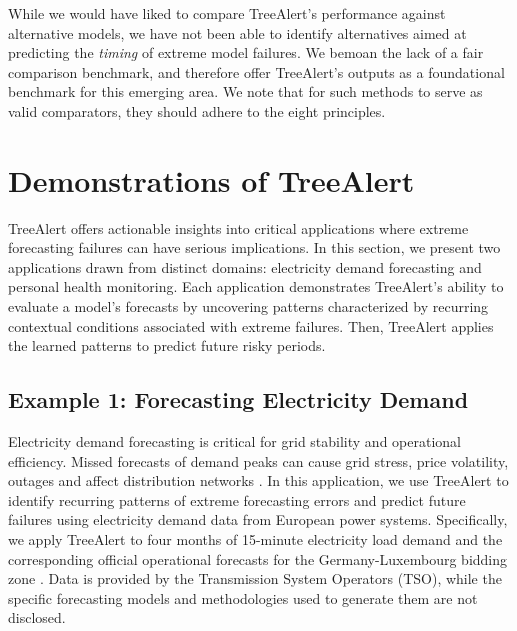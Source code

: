 \documentclass[12pt]{article}
\begin{document}
While we would have liked to compare TreeAlert's performance against alternative models, we have not been able to identify alternatives aimed at predicting the \emph{timing} of extreme model failures. We bemoan the lack of a fair comparison benchmark, %
and therefore offer TreeAlert's outputs as a foundational benchmark for this emerging area. %
We note that for such methods to serve as valid comparators, they should adhere to the eight principles. %

\section{Demonstrations of TreeAlert}
\label{sec-demo}

TreeAlert offers actionable insights into critical applications where extreme forecasting 
failures can have serious implications. In this section, we present two applications drawn 
from distinct domains: electricity demand forecasting and personal health monitoring. 
Each application demonstrates TreeAlert's ability  to evaluate a model's forecasts by uncovering patterns characterized by recurring contextual conditions associated with extreme failures. Then, TreeAlert applies the learned patterns to predict future risky periods.%

\subsection{Example 1: Forecasting Electricity Demand}
Electricity demand forecasting is critical for grid stability and operational efficiency. Missed forecasts of demand peaks can cause grid stress, price volatility, outages and affect distribution networks \citep{ciarreta2023, gilbert2023, steinbuks2019}. In this application, we use TreeAlert to identify recurring patterns of extreme forecasting errors and predict future failures using electricity demand data from European power systems. Specifically, we apply TreeAlert to four months of 15-minute electricity load demand and the corresponding official operational forecasts for the Germany-Luxembourg bidding zone %
\citep{entsoe2025}. Data is provided by the Transmission System Operators (TSO), while the specific forecasting models and methodologies used to generate them are not disclosed. %
\end{document}
